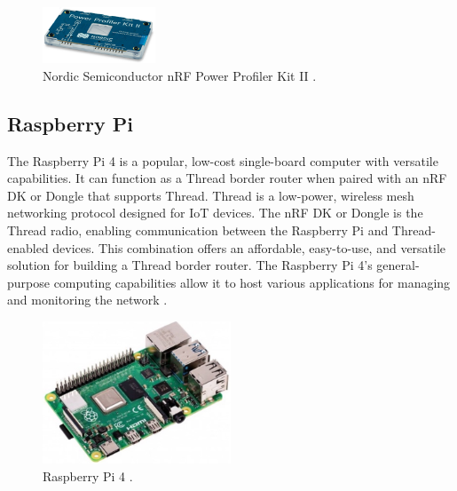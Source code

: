 \begin{figure}[!htb]
    \centering
    \includegraphics[width=0.3\textwidth]{images/situational_theoretical_analysis/nRF_Power_Profiler_Kit_II.png}
    \caption{Nordic Semiconductor nRF Power Profiler Kit II \cite{Semiconductor_Nordic_PPK_II_2018_1.0}.}
    \label{fig:nRF_Power_Profiler_Kit_II}
\end{figure}

\subsection{Raspberry Pi}
The Raspberry Pi 4 is a popular, low-cost single-board computer with versatile capabilities. It can function as a Thread border router when paired with an nRF DK or Dongle that supports Thread. Thread is a low-power, wireless mesh networking protocol designed for IoT devices. The nRF DK or Dongle is the Thread radio, enabling communication between the Raspberry Pi and Thread-enabled devices. This combination offers an affordable, easy-to-use, and versatile solution for building a Thread border router. The Raspberry Pi 4's general-purpose computing capabilities allow it to host various applications for managing and monitoring the network \cite{alm2019internet}.

\begin{figure}[!htb]
    \centering
    \includegraphics[width=0.5\textwidth]{images/situational_theoretical_analysis/Raspberry_Pi_4.jpg}
    \caption{Raspberry Pi 4 \cite{Pi_Raspberry_Pi_4_Model_B_2019_1.0}.}
    \label{fig:Raspberry_Pi_4}
\end{figure}
